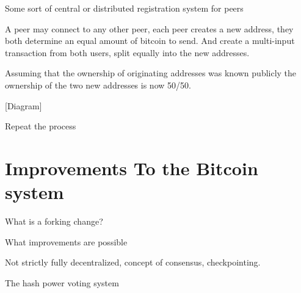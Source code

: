         Some sort of central or distributed registration system for peers

        A peer may connect to any other peer, each peer creates a new address, they both determine an equal amount of bitcoin to send. And create a multi-input transaction from both users, split equally into the new addresses.

        Assuming that the ownership of originating addresses was known publicly the ownership of the two new addresses is now 50/50.

        [Diagram]

        Repeat the process


\section{Improvements To the Bitcoin system}

    What is a forking change?

    What improvements are possible

    Not strictly fully decentralized, concept of consensus, checkpointing.

    The hash power voting system


%
%



